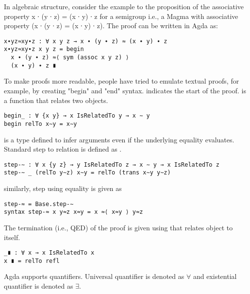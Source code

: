In algebraic structure, consider the example to the proposition of the associative property x ∙ (y ∙ z)
= (x ∙ y) ∙ z  for a semigroup i.e., a Magma with associative property (x ∙ (y ∙
z) = (x ∙ y) ∙ z). The proof can be written in Agda as:
\begin{verbatim}
x∙yz≈xy∙z : ∀ x y z → x ∙ (y ∙ z) ≈ (x ∙ y) ∙ z
x∙yz≈xy∙z x y z = begin 
  x ∙ (y ∙ z) ≈⟨ sym (assoc x y z) ⟩ 
  (x ∙ y) ∙ z ∎
\end{verbatim}
To make proofs more readable, people have tried to emulate textual proofs, for
example, by creating "begin" and "end" syntax.  indicates the start
of the proof.  is a function that relates two objects.
\begin{verbatim}
begin_ : ∀ {x y} → x IsRelatedTo y → x ∼ y
begin relTo x∼y = x∼y
\end{verbatim}
 is a type defined to infer arguments even if the underlying equality
evaluates. Standard step to relation is defined as .
\begin{verbatim}
step-∼ : ∀ x {y z} → y IsRelatedTo z → x ∼ y → x IsRelatedTo z
step-∼ _ (relTo y∼z) x∼y = relTo (trans x∼y y∼z)
\end{verbatim}
similarly, step using equality is given as
\begin{verbatim}
step-≈ = Base.step-∼
syntax step-≈ x y≈z x≈y = x ≈⟨ x≈y ⟩ y≈z
\end{verbatim}
The termination (i.e., QED) of the proof is given using  that relates object to itself.
\begin{verbatim}
_∎ : ∀ x → x IsRelatedTo x
x ∎ = relTo refl
\end{verbatim}
Agda supports quantifiers. Universal quantifier is denoted as \(\forall\) and
existential quantifier is denoted as \(\exists\).

